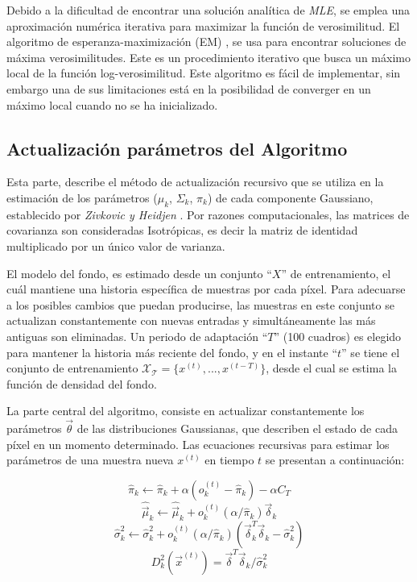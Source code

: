  
Debido a la dificultad de encontrar una solución analítica de \textit{MLE}, se emplea una aproximación numérica iterativa para maximizar la función de verosimilitud.  El algoritmo de esperanza-maximización (EM) \cite{dempster_maximum_1977}, se usa para encontrar soluciones de máxima verosimilitudes. Este es un procedimiento iterativo que busca un máximo local de la función log-verosimilitud. Este algoritmo es fácil de implementar, sin embargo una de sus limitaciones está en la posibilidad de converger en un máximo local cuando no se ha inicializado.


\subsection{Actualización parámetros del Algoritmo}
\label{subsec:actualizacion_parametros_algoritmo}

Esta parte, describe el método de actualización recursivo que se utiliza en la estimación de los parámetros ($\mu_k$, $\Sigma_k$, $\pi_k$) de cada componente Gaussiano, establecido por \textit{Zivkovic y Heidjen} \cite{zivkovic_efficient_2006}. Por razones computacionales, las matrices de covarianza son consideradas Isotrópicas, es decir la matriz de identidad multiplicado por un único valor de varianza.

El modelo del fondo, es estimado desde un conjunto ``$X$'' de entrenamiento, el cuál mantiene una historia específica de muestras por cada píxel. Para adecuarse a los posibles cambios que puedan producirse, las muestras en este conjunto se actualizan constantemente con nuevas entradas y simultáneamente las más antiguas son eliminadas. Un periodo de adaptación ``$T$'' (100 cuadros) es elegido para mantener la historia más reciente del fondo, y en el instante ``$t$'' se tiene el conjunto de entrenamiento $\mathcal{X_T} = \{x^{(t)}, ..., x^{(t-T)}\}$, desde el cual se estima la función de densidad del fondo.

La parte central del algoritmo, consiste en actualizar constantemente los parámetros $\vec{\theta}$ de las distribuciones Gaussianas, que describen el estado de cada píxel en un momento determinado. Las ecuaciones recursivas para estimar los parámetros de una muestra nueva $x^{(t)}$ en tiempo $t$ se presentan a continuación:


\begin{equation} \label{eq:mixturefactor_update}
\hat{\pi}_k \leftarrow  \hat{\pi}_k + \alpha(o^{(t)}_k - \hat{\pi}_k) - \alpha C_T
\end{equation}
\begin{equation} \label{eq:mixturemu_update}
\hat{\vec{\mu}}_k \leftarrow \hat{\vec{\mu}}_k + o^{(t)}_k (\alpha/\hat{\pi}_k) \vec{\delta}_k
\end{equation}
\begin{equation} \label{eq:mixturesigma_update}
\hat{\sigma}^2_k \leftarrow \hat{\sigma}^2_k + o^{(t)}_k (\alpha/\hat{\pi}_k) (\vec{\delta}^T_k \vec{\delta}_k - \hat{\sigma}^2_k)
\end{equation}
\begin{equation} \label{eq:mahalanobis_distance}
D^{2}_{k}(\vec{x}^{(t)})=\vec{\delta}^T\vec{\delta}_k/\hat{\sigma}^{2}_k
\end{equation}

